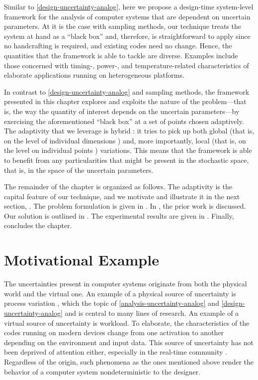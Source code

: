 Similar to \cref{design-uncertainty-analog}, here we propose a design-time
system-level framework for the analysis of computer systems that are dependent
on uncertain parameters. At it is the case with sampling methods, our technique
treats the system at hand as a ``black box'' and, therefore, is straightforward
to apply since no handcrafting is required, and existing codes need no change.
Hence, the quantities that the framework is able to tackle are diverse. Examples
include those concerned with timing-, power-, and temperature-related
characteristics of elaborate applications running on heterogeneous platforms.

In contrast to \cref{design-uncertainty-analog} and sampling methods, the
framework presented in this chapter explores and exploits the nature of the
problem---that is, the way the quantity of interest depends on the uncertain
parameters---by exercising the aforementioned ``black box'' at a set of points
chosen adaptively. The adaptivity that we leverage is hybrid \cite{jakeman2012}:
it tries to pick up both global (that is, on the level of individual dimensions
\cite{klimke2006}) and, more importantly, local (that is, on the level on
individual points \cite{ma2009}) variations. This means that the framework is
able to benefit from any particularities that might be present in the stochastic
space, that is, in the space of the uncertain parameters.

The remainder of the chapter is organized as follows. The adaptivity is the
capital feature of our technique, and we motivate and illustrate it in the next
section, . The problem formulation is given in
. In , the prior work is
discussed. Our solution is outlined in . The
experimental results are given in . Finally,
 concludes the chapter.

\section{Motivational Example}

The uncertainties present in computer systems originate from both the physical
world and the virtual one. An example of a physical source of uncertainty is
process variation \cite{srivastava2010}, which the topic of
\cref{analysis-uncertainty-analog} and \cref{design-uncertainty-analog} and is
central to many lines of research. An example of a virtual source of uncertainty
is workload. To elaborate, the characteristics of the codes running on modern
devices change from one activation to another depending on the environment and
input data. This source of uncertainty has not been deprived of attention
either, especially in the real-time community \cite{quinton2012, diaz2002,
santinelli2011, tanasa2015}. Regardless of the origin, such phenomena as the
ones mentioned above render the behavior of a computer system nondeterministic
to the designer.

